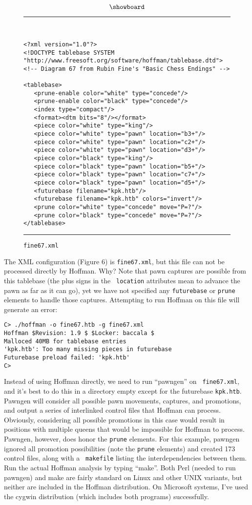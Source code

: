 \documentclass[11pt]{article}
\begin{document}
$$\showboard$$

\begin{figure}
\hrule\ 
{\small\begin{verbatim}
<?xml version="1.0"?>
<!DOCTYPE tablebase SYSTEM "http://www.freesoft.org/software/hoffman/tablebase.dtd">
<!-- Diagram 67 from Rubin Fine's "Basic Chess Endings" -->

<tablebase>
   <prune-enable color="white" type="concede"/>
   <prune-enable color="black" type="concede"/>
   <index type="compact"/>
   <format><dtm bits="8"/></format>
   <piece color="white" type="king"/>
   <piece color="white" type="pawn" location="b3+"/>
   <piece color="white" type="pawn" location="c2+"/>
   <piece color="white" type="pawn" location="d3+"/>
   <piece color="black" type="king"/>
   <piece color="black" type="pawn" location="b5+"/>
   <piece color="black" type="pawn" location="c7+"/>
   <piece color="black" type="pawn" location="d5+"/>
   <futurebase filename="kpk.htb"/>
   <futurebase filename="kpk.htb" colors="invert"/>
   <prune color="white" type="concede" move="P=?"/>
   <prune color="black" type="concede" move="P=?"/>
</tablebase>
\end{verbatim}}
\hrule
\caption{\tt fine67.xml}
\end{figure}

The XML configuration (Figure 6) is {\tt fine67.xml}, but this file
can not be processed directly by Hoffman.  Why?  Note that pawn
captures are possible from this tablebase (the plus signs in the {\tt
location} attributes mean to advance the pawn as far as it can go),
yet we have not specified any {\tt futurebase} or {\tt prune} elements
to handle those captures.  Attempting to run Hoffman on this file will
generate an error:

\begin{verbatim}
C> ./hoffman -o fine67.htb -g fine67.xml
Hoffman $Revision: 1.9 $ $Locker: baccala $
Malloced 40MB for tablebase entries
'kpk.htb': Too many missing pieces in futurebase
Futurebase preload failed: 'kpk.htb'
C>
\end{verbatim}

Instead of using Hoffman directly, we need to run ``pawngen'' on {\tt
fine67.xml}, and it's best to do this in a directory empty except for
the futurebase {\tt kpk.htb}.  Pawngen will consider all possible pawn
movements, captures, and promotions, and output a series of
interlinked control files that Hoffman can process.  Obviously,
considering all possible promotions in this case would result in
positions with multiple queens that would be impossible for Hoffman to
process.  Pawngen, however, does honor the {\tt prune} elements.  For
this example, pawngen ignored all promotion possibilities (note the
{\tt prune} elements) and created 173 control files, along with a {\tt
makefile} listing the interdependencies between them.  Run the actual
Hoffman analysis by typing ``make''.  Both Perl (needed to run
pawngen) and make are fairly standard on Linux and other UNIX
variants, but neither are included in the Hoffman distribution.  On
Microsoft systems, I've used the cygwin distribution (which includes
both programs) successfully.
\end{document}
